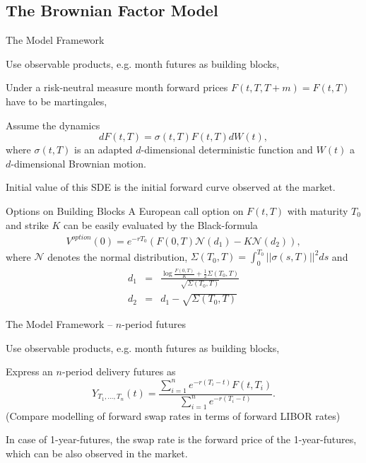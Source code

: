 \subsection{The Brownian Factor Model}

{The Model Framework}






	Use observable products, e.g. month futures as building blocks,

	Under a risk-neutral measure month forward prices $F(t,T,T+m)=F(t,T)$ have to be martingales,

	Assume the dynamics
$$dF(t,T)=\sigma(t,T)F(t,T)dW(t),$$
where $\sigma(t,T)$ is an adapted $d$-dimensional deterministic function and
$W(t)$ a $d$-dimensional Brownian motion.

	Initial value of this SDE is the initial forward curve observed at the market.






{Options on Building Blocks}
A European call option on $F(t,T)$ with maturity $T_0$ and strike
$K$ can be easily evaluated by the Black-formula
\begin{eqnarray}\label{eq:month-option}
V^{option}(0)=e^{-rT_0}\left(F(0,T)\mathcal{N}(d_1)-K\mathcal{N} (d_2)\right),
\end{eqnarray}
where $\mathcal{N}$ denotes the normal distribution, $\Sigma(T_0,T)=\int_0^{T_0}||\sigma(s,T)||^2ds$ and
\begin{eqnarray*}
d_1& = & \frac{\log \frac{F(0,T)}{K}+\frac{1}{2}\Sigma(T_0,T)}{\sqrt{\Sigma(T_0,T)}}\\
d_2 & = & d_1 - \sqrt{\Sigma(T_0,T)}
\end{eqnarray*}

{The Model Framework -- $n$-period futures}






	Use observable products, e.g. month futures as building blocks,

	Express an $n$-period delivery futures as
$$Y_{T_1, \ldots, T_n}(t)=\frac{\sum_{i=1}^n e^{-r(T_i-t)}F(t,T_i)}{\sum_{i=1}^n e^{-r(T_i-t)}}.$$
(Compare modelling of forward swap rates in terms of forward LIBOR rates)

	In case of 1-year-futures, the swap rate is the forward price of the 1-year-futures,
which can be also observed in the market.



